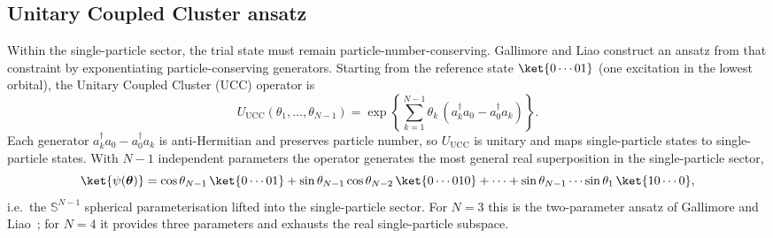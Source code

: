 \subsection{Unitary Coupled Cluster ansatz}
\label{ssec:ucc_ansatz}

Within the single-particle sector, the trial state must remain
particle-number-conserving. Gallimore and Liao construct an ansatz from
that constraint by exponentiating particle-conserving generators. Starting
from the reference state $\ket{0\cdots 01}$ (one excitation in the lowest
orbital), the Unitary Coupled Cluster (UCC) operator is
\begin{equation}
  \label{eq:ucc_operator}
  U_{\mathrm{UCC}}(\theta_1,\ldots,\theta_{N-1}) =
  \exp\!\left\{
    \sum_{k=1}^{N-1}\theta_k\,(a_k^{\dagger}a_0 - a_0^{\dagger}a_k)
  \right\}.
\end{equation}
Each generator $a_k^{\dagger}a_0 - a_0^{\dagger}a_k$ is anti-Hermitian and
preserves particle number, so $U_{\mathrm{UCC}}$ is unitary and maps
single-particle states to single-particle states. With $N-1$ independent
parameters the operator generates the most general real superposition in
the single-particle sector,
\begin{equation}
  \label{eq:ucc_state}
  \ket{\psi(\bm{\theta})} =
    \cos\theta_{N-1}\,\ket{0\cdots 01}
    + \sin\theta_{N-1}\cos\theta_{N-2}\,\ket{0\cdots 010}
    + \cdots
    + \sin\theta_{N-1}\cdots\sin\theta_1\,\ket{10\cdots 0},
\end{equation}
i.e.\ the $\mathbb{S}^{N-1}$ spherical parameterisation lifted into the
single-particle sector. For $N=3$ this is the two-parameter ansatz of
Gallimore and Liao~\cite{gallimore2023}; for $N=4$ it provides three
parameters and exhausts the real single-particle subspace.

